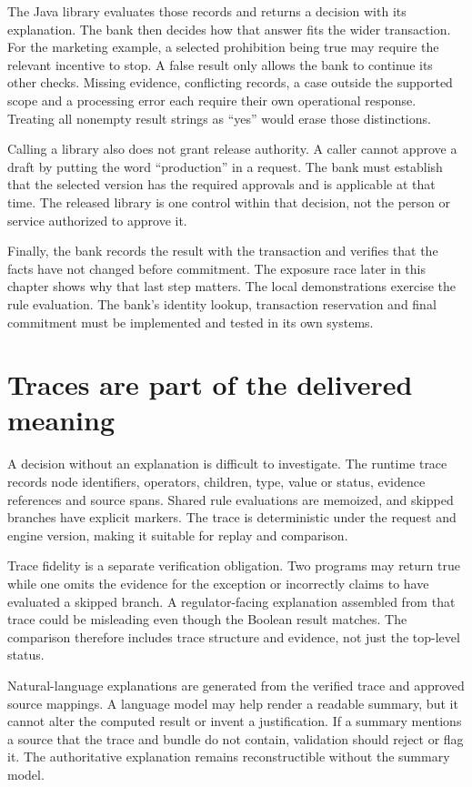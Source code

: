The Java library evaluates those records and returns a decision with its
explanation. The bank then decides how that answer fits the wider transaction.
For the marketing example, a selected prohibition being true may require the
relevant incentive to stop. A false result only allows the bank to continue its
other checks. Missing evidence, conflicting records, a case outside the supported
scope and a processing error each require their own operational response. Treating
all nonempty result strings as ``yes'' would erase those distinctions.

Calling a library also does not grant release authority. A caller cannot approve
a draft by putting the word ``production'' in a request. The bank must establish
that the selected version has the required approvals and is applicable at that
time. The released library is one control within that decision, not the person
or service authorized to approve it.

Finally, the bank records the result with the transaction and verifies that the
facts have not changed before commitment. The exposure race later in this chapter
shows why that last step matters. The local demonstrations exercise the rule
evaluation. The bank's identity lookup, transaction reservation and final
commitment must be implemented and tested in its own systems.


\section{Traces are part of the delivered meaning}
\label{merge:M07:10}


A decision without an explanation is difficult to investigate. The runtime trace
records node identifiers, operators, children, type, value or status, evidence
references and source spans. Shared rule evaluations are memoized, and skipped
branches have explicit markers. The trace is deterministic under the request and
engine version, making it suitable for replay and comparison.

Trace fidelity is a separate verification obligation. Two programs may return
true while one omits the evidence for the exception or incorrectly claims to have
evaluated a skipped branch. A regulator-facing explanation assembled from that
trace could be misleading even though the Boolean result matches. The comparison
therefore includes trace structure and evidence, not just the top-level status.


Natural-language explanations are generated from the verified trace and approved
source mappings. A language model may help render a readable summary, but it
cannot alter the computed result or invent a justification. If a summary mentions
a source that the trace and bundle do not contain, validation should reject or
flag it. The authoritative explanation remains reconstructible without the
summary model.

